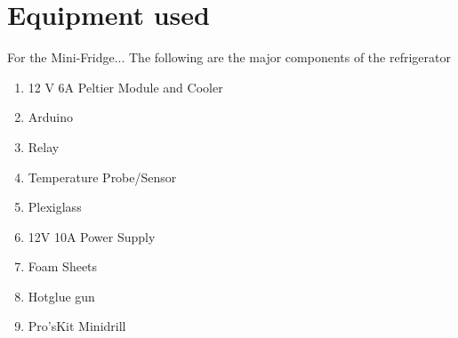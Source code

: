\documentclass[10pt]{beamer}
\begin{document}
\section{Equipment used}
{	
	\begin{frame}{For the Mini-Fridge...}
	The following are the major components of the refrigerator
	\begin{enumerate}[<+- | alert@+>]
		\item 12 V 6A Peltier Module and Cooler
		\item Arduino
		\item Relay
		\item Temperature Probe/Sensor
		\item Plexiglass
		\item 12V 10A Power Supply
		\item Foam Sheets
		\item Hotglue gun
		\item Pro'sKit Minidrill
	\end{enumerate}
\end{frame}
}
\end{document}
